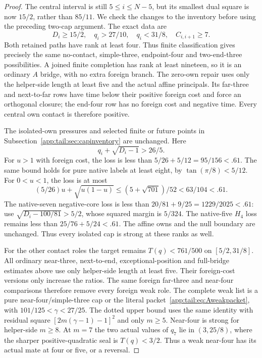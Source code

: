 \documentclass[11pt]{article}
\theoremstyle{definition}
\theoremstyle{remark}
\begin{document}
\begin{proof}
The central interval is still $5\le i\le N-5$, but its smallest
dual square is now $15/2$, rather than $85/11$. We check the
changes to the inventory before using the preceding two-cap argument.
The exact data are
\[
 D_i\ge15/2,\quad q_i>27/10,\quad q_i<31/8,\quad
 C_{i,i+1}\ge7.
\]
Both retained paths have rank at least four. Thus finite classification
gives precisely the same no-contact, simple-three, endpoint-four and
two-end-three possibilities. A joined finite completion has rank at
least nineteen, so it is an ordinary $A$ bridge, with no extra foreign
branch. The zero-own repair uses only the helper-side length at least
five and the actual affine principals. Its far-three and next-to-far
rows have time below their positive foreign cost and force an
orthogonal closure; the end-four row has no foreign cost and negative
time. Every central own contact is therefore positive.

The isolated-own pressures and selected finite or future points in
Subsection~\ref{app:tail:sec:capinventory} are unchanged. Here
\[
 q_i+\sqrt{D_i-1}>26/5.
\]
For $u>1$ with foreign cost, the loss is less than
$5/26+5/12=95/156<.61$. The same bound holds for pure native
labels at least eight, by $\tan(\pi/8)<5/12$.
For $0<u<1$, the loss is at most
\[
 (5/26)u+\sqrt{u(1-u)}
 \le(5+\sqrt{701})/52<63/104<.61.
\]
The native-seven negative-core loss is less than
$20/81+9/25=1229/2025<.61$: use
$\sqrt{D_i-100/81}>5/2$, whose squared margin is $5/324$.
The native-five $H_4$ loss remains less than
$25/76+5/24<.61$. The affine owns and the null boundary are
unchanged. Thus every isolated cap is strong at these ranks as well.

For the other contact roles the target remains
$T(q)<761/500$ on $[5/2,31/8]$. All ordinary near-three,
next-to-end, exceptional-position and full-bridge estimates above
use only helper-side length at least five. Their foreign-cost
versions only increase the ratios. The same foreign far-three
and near-four comparisons therefore remove every foreign weak role.
The complete weak list is a pure near-four/simple-three cap or
the literal packet~\eqref{app:tail:eq:Aweakpacket}, with
$101/125<\gamma<27/25$. The dotted upper bound uses the
same identity with residual square
$[2m(\gamma-1)-1]^2$ and only $m\ge5$.
Near-four is strong for helper-side $m\ge8$. At $m=7$ the
two actual values of $q_7$ lie in $(3,25/8)$, where the
sharper positive-quadratic seal is $T(q)<3/2$. Thus a weak
near-four has its actual mate at four or five, or a reversal.


\end{proof}
\end{document}
